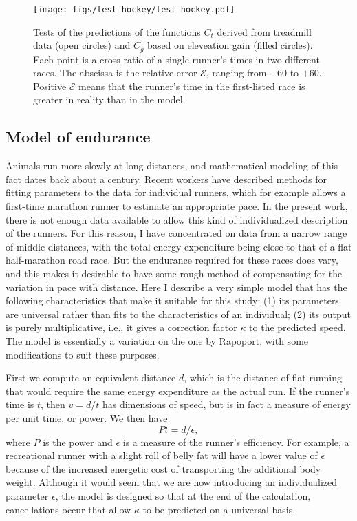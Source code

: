 \documentclass[10pt,letterpaper]{article}
\begin{document}
\begin{figure}[h]
\texttt{[image: figs/test-hockey/test-hockey.pdf]}
\centering
\caption{Tests of the predictions of the functions $C_t$ derived from treadmill data (open circles)
and $C_g$ based on eleveation gain (filled circles). Each point is a cross-ratio of a single runner's
times in two different races. The abscissa is the relative error
$\mathcal{E}$, ranging from $-60$ to $+60$. Positive $\mathcal{E}$ means that the runner's
time in the first-listed race is greater in reality than in the model.
}
\label{fig:test-hockey}
\end{figure}

\subsection*{Model of endurance}

Animals run more slowly at long distances, and mathematical modeling of this fact dates back
about a century.\cite{hill} Recent workers have described methods for fitting parameters
to the data for individual runners,\cite{rapoport}\cite{emig} which for example allows
a first-time marathon runner to estimate an appropriate pace. In the present work, there is
not enough data available to allow this kind of individualized description of the runners.
For this reason, I have concentrated on data from a narrow range of middle distances,
with the total energy expenditure being close to that of a flat half-marathon road race.
But the endurance required for these races does vary, and this makes it desirable to have
some rough method of compensating for the variation in pace with distance. Here I describe
a very simple model that has the following characteristics that make it suitable for this
study: (1) its parameters are universal rather than fits to the characteristics of an individual;
(2) its output is purely multiplicative, i.e., it gives a correction factor $\kappa$ to the predicted speed.
The model is essentially a variation on the one by Rapoport,\cite{rapoport} with some modifications
to suit these purposes.

First we compute an equivalent distance $d$, which is the distance of flat running that would
require the same energy expenditure as the actual run. If the runner's time is $t$, then
$v=d/t$ has dimensions of speed, but is in fact a measure of energy per unit time, or power.
We then have
\begin{equation}\label{eq:fuel-model-1}
  Pt=d/\epsilon,
\end{equation}
where $P$ is the power and $\epsilon$ is a measure of the runner's efficiency. For example,
a recreational runner with a slight roll of belly fat will have a lower value of $\epsilon$ because of
the increased energetic cost of transporting the additional body weight. Although it would seem that
we are now introducing an individualized parameter $\epsilon$, the model is designed so that at the
end of the calculation, cancellations occur that allow $\kappa$ to be predicted on a universal basis.
\end{document}
